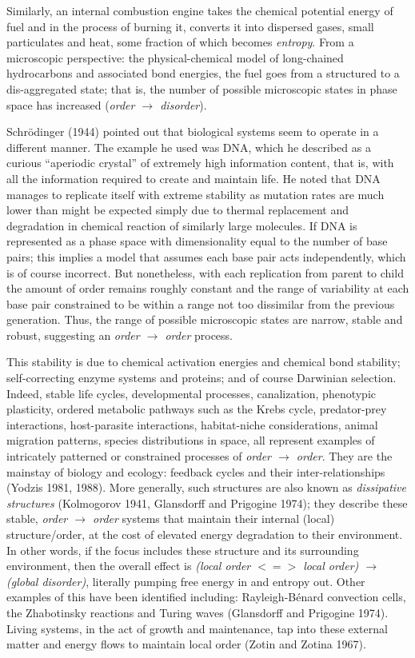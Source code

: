 \documentclass[11pt,letterpaper,]{paper}
\begin{document}
Similarly, an internal combustion engine takes the chemical potential
energy of fuel and in the process of burning it, converts it into
dispersed gases, small particulates and heat, some fraction of which
becomes \emph{entropy}. From a microscopic perspective: the
physical-chemical model of long-chained hydrocarbons and associated bond
energies, the fuel goes from a structured to a dis-aggregated state;
that is, the number of possible microscopic states in phase space has
increased (\emph{order \(\rightarrow\) disorder}).

Schrödinger (1944) pointed out that biological systems seem to operate
in a different manner. The example he used was DNA, which he described
as a curious ``aperiodic crystal'' of extremely high information
content, that is, with all the information required to create and
maintain life. He noted that DNA manages to replicate itself with
extreme stability as mutation rates are much lower than might be
expected simply due to thermal replacement and degradation in chemical
reaction of similarly large molecules. If DNA is represented as a phase
space with dimensionality equal to the number of base pairs; this
implies a model that assumes each base pair acts independently, which is
of course incorrect. But nonetheless, with each replication from parent
to child the amount of order remains roughly constant and the range of
variability at each base pair constrained to be within a range not too
dissimilar from the previous generation. Thus, the range of possible
microscopic states are narrow, stable and robust, suggesting an
\emph{order \(\rightarrow\) order} process.

This stability is due to chemical activation energies and chemical bond
stability; self-correcting enzyme systems and proteins; and of course
Darwinian selection. Indeed, stable life cycles, developmental
processes, canalization, phenotypic plasticity, ordered metabolic
pathways such as the Krebs cycle, predator-prey interactions,
host-parasite interactions, habitat-niche considerations, animal
migration patterns, species distributions in space, all represent
examples of intricately patterned or constrained processes of
\emph{order \(\rightarrow\) order}. They are the mainstay of biology and
ecology: feedback cycles and their inter-relationships (Yodzis 1981,
1988). More generally, such structures are also known as
\emph{dissipative structures} (Kolmogorov 1941, Glansdorff and Prigogine
1974); they describe these stable, \emph{order \(\rightarrow\) order}
systems that maintain their internal (local) structure/order, at the
cost of elevated energy degradation to their environment. In other
words, if the focus includes these structure and its surrounding
environment, then the overall effect is \emph{(local order \(<=>\) local
order) \(\rightarrow\) (global disorder)}, literally pumping free energy
in and entropy out. Other examples of this have been identified
including: Rayleigh-Bénard convection cells, the Zhabotinsky reactions
and Turing waves (Glansdorff and Prigogine 1974). Living systems, in the
act of growth and maintenance, tap into these external matter and energy
flows to maintain local order (Zotin and Zotina 1967).
\end{document}
